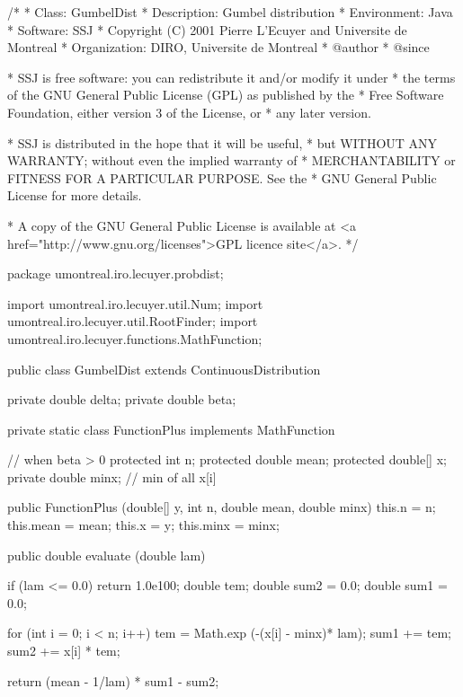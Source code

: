 \begin{code}
\begin{hide}
/*
 * Class:        GumbelDist
 * Description:  Gumbel distribution
 * Environment:  Java
 * Software:     SSJ
 * Copyright (C) 2001  Pierre L'Ecuyer and Universite de Montreal
 * Organization: DIRO, Universite de Montreal
 * @author
 * @since

 * SSJ is free software: you can redistribute it and/or modify it under
 * the terms of the GNU General Public License (GPL) as published by the
 * Free Software Foundation, either version 3 of the License, or
 * any later version.

 * SSJ is distributed in the hope that it will be useful,
 * but WITHOUT ANY WARRANTY; without even the implied warranty of
 * MERCHANTABILITY or FITNESS FOR A PARTICULAR PURPOSE.  See the
 * GNU General Public License for more details.

 * A copy of the GNU General Public License is available at
   <a href="http://www.gnu.org/licenses">GPL licence site</a>.
 */
\end{hide}
package umontreal.iro.lecuyer.probdist;
\begin{hide}
import umontreal.iro.lecuyer.util.Num;
import umontreal.iro.lecuyer.util.RootFinder;
import umontreal.iro.lecuyer.functions.MathFunction;
\end{hide}
public class GumbelDist extends ContinuousDistribution\begin{hide} {
   private double delta;
   private double beta;

   private static class FunctionPlus implements MathFunction {
      // when beta > 0
      protected int n;
      protected double mean;
      protected double[] x;
      private double minx;   // min of all {x[i]}

      public FunctionPlus (double[] y, int n, double mean, double minx) {
         this.n = n;
         this.mean = mean;
         this.x = y;
         this.minx = minx;
      }

      public double evaluate (double lam) {
         if (lam <= 0.0) return 1.0e100;
         double tem;
         double sum2 = 0.0;
         double sum1 = 0.0;

         for (int i = 0; i < n; i++) {
            tem = Math.exp (-(x[i] - minx)* lam);
            sum1 += tem;
            sum2 += x[i] * tem;
         }

         return (mean - 1/lam) * sum1 - sum2;
      }
   }


}
\end{hide}
\end{code}
